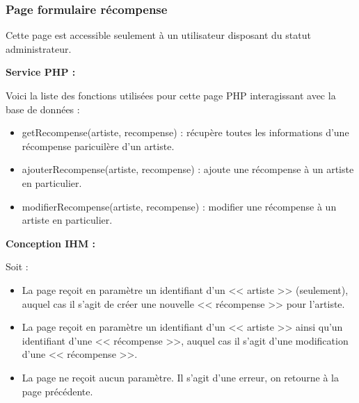 	\clearpage

		\subsubsection{Page formulaire récompense}

			\begin{paragraphe}
				Cette page est accessible seulement à un utilisateur disposant du statut administrateur.
			\end{paragraphe}

			\begin{paragraphe}
				\textbf{Service PHP :}
			\end{paragraphe}

			\begin{paragraphe}
				Voici la liste des fonctions utilisées pour cette page PHP interagissant avec la base de données :
				\begin{itemize}
					\item getRecompense(artiste, recompense) : récupère toutes les informations d'une récompense paricuilère d'un artiste.
					\item ajouterRecompense(artiste, recompense) : ajoute une récompense à un artiste en particulier.
					\item modifierRecompense(artiste, recompense) : modifier une récompense à un artiste en particulier.
				\end{itemize}
			\end{paragraphe}

			\begin{paragraphe}
				\textbf{Conception IHM :}
			\end{paragraphe}

			\begin{paragraphe}
				Soit :
				\begin{itemize}
					\item La page reçoit en paramètre un identifiant d'un << artiste >> (seulement), auquel cas il s'agit de créer une nouvelle << récompense >> pour l'artiste.
					\item La page reçoit en paramètre un identifiant d'un << artiste >> ainsi qu'un identifiant d'une << récompense >>, auquel cas il s'agit d'une modification d'une << récompense >>.
					\item La page ne reçoit aucun paramètre. Il s'agit d'une erreur, on retourne à la page précédente.
				\end{itemize}
			\end{paragraphe}

